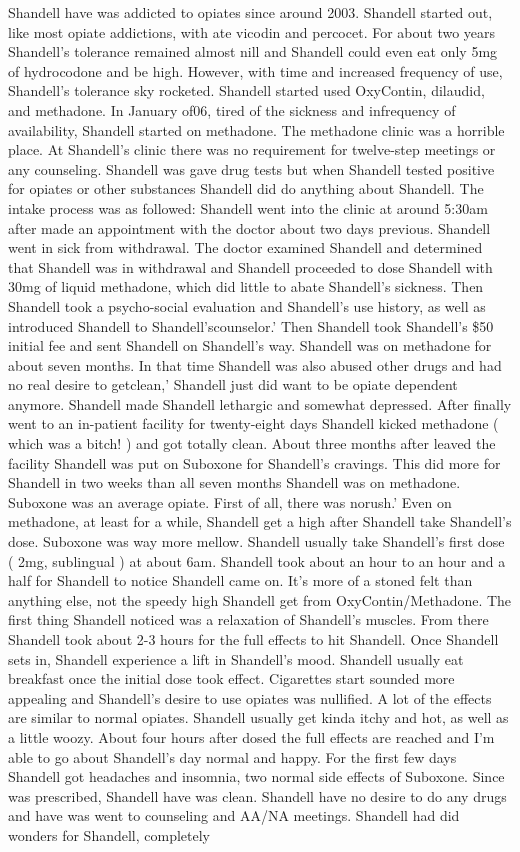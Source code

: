 \documentclass[12pt]{book}
\begin{document}
Shandell have was addicted to opiates since around 2003. Shandell started out, like most opiate addictions, with ate vicodin and percocet. For about two years Shandell's tolerance remained almost nill and Shandell could even eat only 5mg of hydrocodone and be high. However, with time and increased frequency of use, Shandell's tolerance sky rocketed. Shandell started used OxyContin, dilaudid, and methadone. In January of06, tired of the sickness and infrequency of availability, Shandell started on methadone. The methadone clinic was a horrible place. At Shandell's clinic there was no requirement for twelve-step meetings or any counseling. Shandell was gave drug tests but when Shandell tested positive for opiates or other substances Shandell did do anything about Shandell. The intake process was as followed: Shandell went into the clinic at around 5:30am after made an appointment with the doctor about two days previous. Shandell went in sick from withdrawal. The doctor examined Shandell and determined that Shandell was in withdrawal and Shandell proceeded to dose Shandell with 30mg of liquid methadone, which did little to abate Shandell's sickness. Then Shandell took a psycho-social evaluation and Shandell's use history, as well as introduced Shandell to Shandell'scounselor.' Then Shandell took Shandell's \$50 initial fee and sent Shandell on Shandell's way. Shandell was on methadone for about seven months. In that time Shandell was also abused other drugs and had no real desire to getclean,' Shandell just did want to be opiate dependent anymore. Shandell made Shandell lethargic and somewhat depressed. After finally went to an in-patient facility for twenty-eight days Shandell kicked methadone ( which was a bitch! ) and got totally clean. About three months after leaved the facility Shandell was put on Suboxone for Shandell's cravings. This did more for Shandell in two weeks than all seven months Shandell was on methadone. Suboxone was an average opiate. First of all, there was norush.' Even on methadone, at least for a while, Shandell get a high after Shandell take Shandell's dose. Suboxone was way more mellow. Shandell usually take Shandell's first dose ( 2mg, sublingual ) at about 6am. Shandell took about an hour to an hour and a half for Shandell to notice Shandell came on. It's more of a stoned felt than anything else, not the speedy high Shandell get from OxyContin/Methadone. The first thing Shandell noticed was a relaxation of Shandell's muscles. From there Shandell took about 2-3 hours for the full effects to hit Shandell. Once Shandell sets in, Shandell experience a lift in Shandell's mood. Shandell usually eat breakfast once the initial dose took effect. Cigarettes start sounded more appealing and Shandell's desire to use opiates was nullified. A lot of the effects are similar to normal opiates. Shandell usually get kinda itchy and hot, as well as a little woozy. About four hours after dosed the full effects are reached and I'm able to go about Shandell's day normal and happy. For the first few days Shandell got headaches and insomnia, two normal side effects of Suboxone. Since was prescribed, Shandell have was clean. Shandell have no desire to do any drugs and have was went to counseling and AA/NA meetings. Shandell had did wonders for Shandell, completely 
\end{document}
